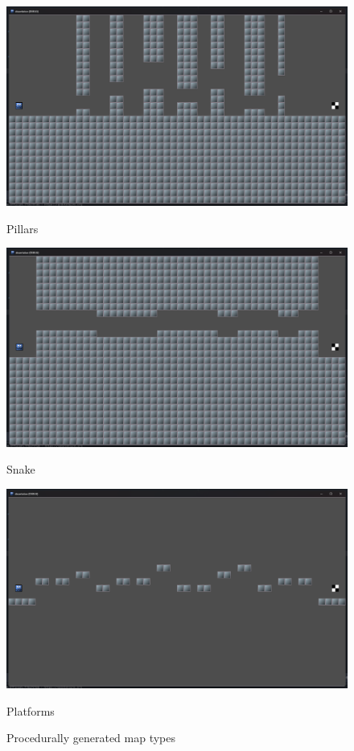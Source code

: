 \begin{figure}[H]
    \centering
    \begin{minipage}{0.32\textwidth}
        \centering
        \includegraphics[width=\linewidth]{figures/pillars}
        \caption{Pillars}
        \label{fig:pillars}
    \end{minipage}
    \hfill
    \begin{minipage}{0.32\textwidth}
        \centering
        \includegraphics[width=\linewidth]{figures/snake}
        \caption{Snake}
        \label{fig:snake}
    \end{minipage}
    \hfill
    \begin{minipage}{0.32\textwidth}
        \centering
        \includegraphics[width=\linewidth]{figures/platforms}
        \caption{Platforms}
        \label{fig:platforms}
    \end{minipage}
    \caption{Procedurally generated map types}
    \label{fig:map_types}
\end{figure}

